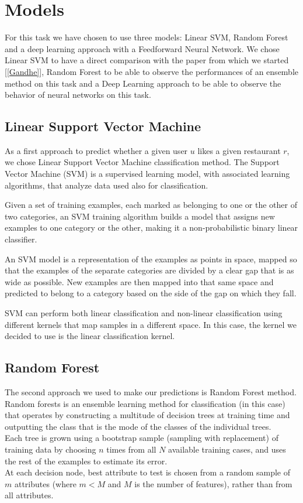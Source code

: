 
\section{Models}

For this task we have chosen to use three models: Linear SVM, Random Forest and a deep learning approach with a Feedforward Neural Network. We chose Linear SVM to have a direct comparison with the paper from which we started [\ref{Gandhe}], Random Forest to be able to observe the performances of an ensemble method on this task and a Deep Learning approach to be able to observe the behavior of neural networks on this task.

\subsection{Linear Support Vector Machine}
As a first approach to predict whether a given user $u$ likes a given restaurant $r$, we chose Linear Support Vector Machine classification method. The Support Vector Machine (SVM) is a supervised learning model, with associated learning algorithms, that analyze data used also for classification.

Given a set of training examples, each marked as belonging to one or the other of two categories, an SVM training algorithm builds a model that assigns new examples to one category or the other, making it a non-probabilistic binary linear classifier.

An SVM model is a representation of the examples as points in space, mapped so that the examples of the separate categories are divided by a clear gap that is as wide as possible. New examples are then mapped into that same space and predicted to belong to a category based on the side of the gap on which they fall.

SVM can perform both linear classification and non-linear classification using different kernels that map samples in a different space. In this case, the kernel we decided to use is the linear classification kernel.


\subsection{Random Forest}
The second approach we used to make our predictions is Random Forest method. Random forests is an ensemble learning method for classification (in this case) that operates by constructing a multitude of decision trees at training time and outputting the class that is the mode of the classes of the individual trees. \\
Each tree is grown using a bootstrap sample (sampling with replacement) of training data by choosing $n$ times from all $N$ available training cases, and uses the rest of the examples to estimate its error. \\
At each decision node, best attribute to test is chosen from a random sample of $m$ attributes (where $m < M$ and $M$ is the number of features), rather than from all attributes.

